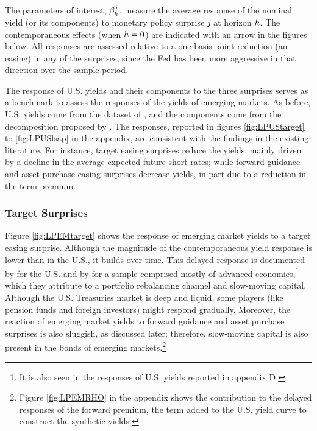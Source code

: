 {The parameters of interest, \(\beta^{j}_{h}\), measure the average response of the nominal yield (or its components) to monetary policy surprise \(j\) at horizon \(h\). 
The contemporaneous effects (when \(h = 0\)) are indicated with an arrow in the figures below. 
All responses are assessed relative to a one basis point reduction (an easing) in any of the surprises, since the Fed has been more aggressive in that direction over the sample period.

The response of U.S. yields and their components to the three surprises serves as a benchmark to assess the responses of the yields of emerging markets. 
As before, U.S. yields come from the dataset of \cite{GSW:2007}, and the components come from the decomposition proposed by \cite{KimWright:2005}. 
The responses, reported in figures \ref{fig:LPUStarget} to \ref{fig:LPUSlsap} in the appendix, 
are consistent with the findings in the existing literature. 
For instance, target easing surprises reduce the yields, mainly driven by a decline in the average expected future short rates; while forward guidance and asset purchase easing surprises decrease yields, in part due to a reduction in the term premium.


\subsubsection{Target Surprises}
\iftoggle{toclinks}{\gototoc}{} %

Figure \ref{fig:LPEMtarget} shows the response of emerging market yields to a target easing surprise.
Although the magnitude of the contemporaneous yield response is lower than in the U.S., it builds over time.
This delayed response is documented by \cite{BrooksKatzLustig:2019} for the U.S. and by \cite{ACDM:2019} for a sample comprised mostly of advanced economies,\footnote{ It is also seen in the responses of U.S. yields reported in appendix D.} which they attribute to a portfolio rebalancing channel and slow-moving capital.  Although the U.S. Treasuries market is deep and liquid, some players (like pension funds and foreign investors) might respond gradually. 
Moreover, the reaction of emerging market yields to forward guidance and asset purchase surprises is also sluggish, as discussed later; therefore, slow-moving capital is also present in the bonds of emerging markets.\footnote{ Figure \ref{fig:LPEMRHO} in the appendix shows the contribution to the delayed responses of the forward premium, the term added to the U.S. yield curve to construct the synthetic yields.} 

}
